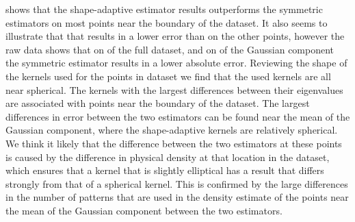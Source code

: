 		





		 shows that the shape-adaptive estimator results outperforms the symmetric estimators on most points near the boundary of the dataset. It also seems to illustrate that that \mbe results in a lower error than \sambe on the other points, however the raw data shows that on  of the full dataset, and on  of the Gaussian component the symmetric estimator results in a lower absolute error.
		Reviewing the shape of the kernels used for the points in dataset \ferdosiOne we find that the used kernels are all near spherical. The kernels with the largest differences between their eigenvalues are associated with points near the boundary of the dataset. 
		The largest differences in error between the two estimators can be found near the mean of the Gaussian component, where the shape-adaptive kernels are relatively spherical. We think it likely that the difference between the two estimators at these points is caused by the difference in physical density at that location in the dataset, which ensures that a kernel that is slightly elliptical has a result that differs strongly from that of a spherical kernel. This is confirmed by the large differences in the number of patterns that are used in the density estimate of the points near the mean of the Gaussian component between the two estimators. 

